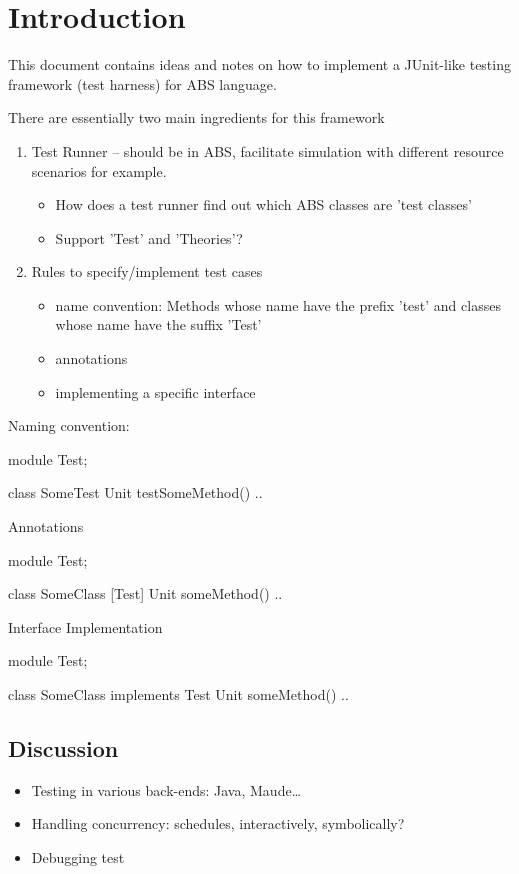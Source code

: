 \documentclass[a4paper,11pt,final]{article}
\title{\deliverableTitle}
\author{Peter Y. H. Wong}
\begin{document}
\maketitle 

\section{Introduction}
This document contains ideas and notes on how to implement a JUnit-like testing
framework (test harness) for ABS language.

There are essentially two main ingredients for this framework
\begin{enumerate}
  \item Test Runner -- should be in ABS, facilitate simulation with different
  resource scenarios for example.
  \begin{itemize}
    \item How does a test runner find out which ABS classes are 'test classes' 
    \item Support 'Test' and 'Theories'?
  \end{itemize}
  \item Rules to specify/implement test cases
  \begin{itemize}
    \item name convention: Methods whose name have the prefix 'test' and classes whose name have the suffix 'Test'
    \item annotations 
    \item implementing a specific interface
  \end{itemize}
\end{enumerate}

\noindent Naming convention:
\begin{absexamplen}
module Test;

class SomeTest { 
  Unit testSomeMethod() {
  	 ..
  }
}
\end{absexamplen}

\noindent Annotations
\begin{absexamplen}
module Test;

class SomeClass { 
  [Test] Unit someMethod() {
  	 ..
  }
}
\end{absexamplen}

\noindent Interface Implementation
\begin{absexamplen}
module Test;

class SomeClass implements Test { 
  Unit someMethod() {
  	 ..
  }
}
\end{absexamplen}

\subsection{Discussion}
\begin{itemize}
  \item Testing in various back-ends: Java, Maude\ldots
  \item Handling concurrency: schedules, interactively, symbolically?
  \item Debugging test
\end{itemize}
\end{document}
